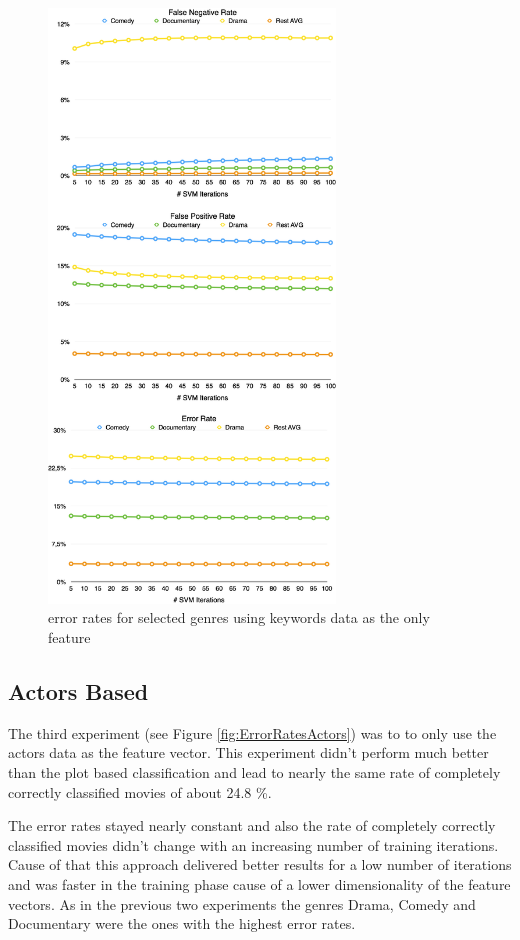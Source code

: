 \documentclass{vldb}
\begin{document}
\begin{figure}
\begin{center}
\includegraphics[width=3.00in]{ErrorRatesKeywords.png}
\caption{error rates for selected genres using keywords data as the only feature}
\label{fig:ErrorRatesKeywords}
\end{center}
\end{figure}

\subsection{Actors Based}
\par The third experiment (see Figure \ref{fig:ErrorRatesActors})  was to to only use the actors data as the feature vector. This experiment didn’t perform much better than the plot based classification and lead to nearly the same rate of completely correctly classified movies of about 24.8 \%.
\par The error rates stayed nearly constant and also the rate of completely correctly classified movies didn’t change with an increasing number of training iterations. Cause of that this approach delivered better results for a low number of iterations and was faster in the training phase cause of a lower dimensionality of the feature vectors.
As in the previous two experiments the genres Drama, Comedy and Documentary were the ones with the highest error rates.
\end{document}
